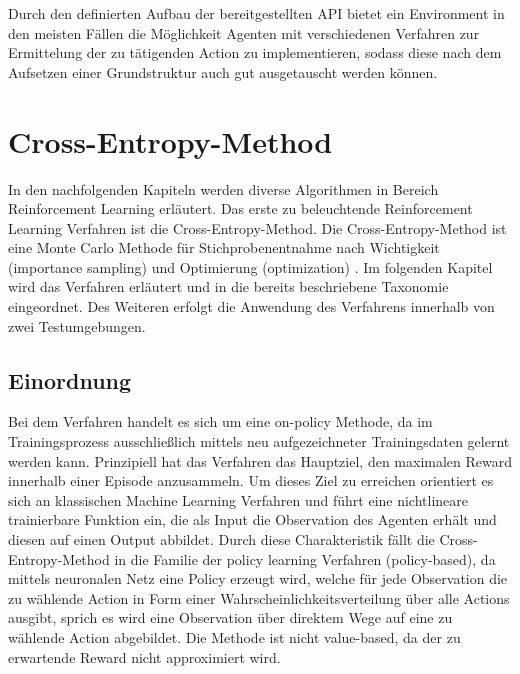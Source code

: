 \documentclass[11pt]{scrartcl}
\begin{document}
Durch den definierten Aufbau der bereitgestellten API bietet ein Environment in den meisten Fällen
die Möglichkeit Agenten mit verschiedenen Verfahren zur Ermittelung der zu tätigenden Action zu
implementieren, sodass diese nach dem Aufsetzen einer Grundstruktur auch gut ausgetauscht werden
können.


\newpage
\section{Cross-Entropy-Method}
\label{sec:cross-entropy-method}
In den nachfolgenden Kapiteln werden diverse Algorithmen in Bereich Reinforcement Learning
erläutert. Das erste zu beleuchtende Reinforcement Learning Verfahren ist die
Cross-Entropy-Method. Die Cross-Entropy-Method ist eine Monte Carlo Methode für
Stichprobenentnahme nach Wichtigkeit (importance sampling) und Optimierung (optimization)
\cite[~S.29 ff.]{R2004}. Im folgenden Kapitel wird das Verfahren erläutert und in die bereits
beschriebene Taxonomie eingeordnet. Des Weiteren erfolgt die Anwendung des Verfahrens innerhalb
von zwei Testumgebungen. 

\subsection{Einordnung}
Bei dem Verfahren handelt es sich um eine on-policy Methode, da im Trainingsprozess ausschließlich
mittels neu aufgezeichneter Trainingsdaten gelernt werden kann. Prinzipiell hat das Verfahren das
Hauptziel, den maximalen Reward innerhalb einer Episode anzusammeln. Um dieses Ziel zu erreichen
orientiert es sich an klassischen Machine Learning Verfahren und führt eine nichtlineare trainierbare
Funktion ein, die als Input die Observation des Agenten erhält und diesen auf einen Output abbildet.
Durch diese Charakteristik fällt die Cross-Entropy-Method in die Familie der policy learning Verfahren
(policy-based), da mittels neuronalen Netz eine Policy erzeugt wird, welche für jede Observation die
zu wählende Action in Form einer Wahrscheinlichkeitsverteilung über alle Actions ausgibt, sprich es
wird eine Observation über direktem Wege auf eine zu wählende Action abgebildet. Die
Methode ist nicht value-based, da der zu erwartende Reward nicht approximiert wird.
\end{document}
